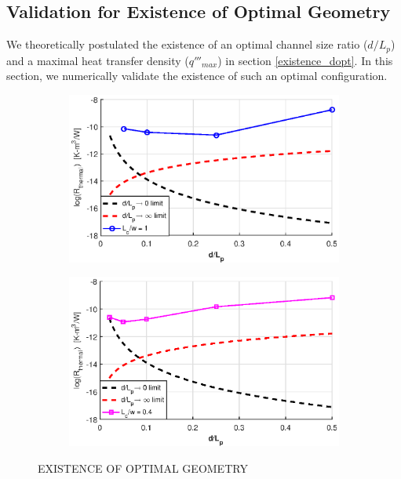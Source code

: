 \documentclass[twocolumn,10pt,cleanfoot]{ihmtc}
\begin{document}
\subsection{Validation for Existence of Optimal Geometry}\label{optgeo}
We theoretically postulated the existence of an optimal channel size ratio ($d/L_p$) and a maximal heat transfer density ($q'''_{max}$) in section \ref{existence_dopt}. In this section, we numerically validate the existence of such an optimal configuration. 
%
\begin{figure}
\centering
   \begin{subfigure}[b]{0.55\textwidth}
   \includegraphics[width=0.85\linewidth]{Rmin_a.eps}
   \caption{}
   \label{Rmin_a} 
\end{subfigure}
%
   \begin{subfigure}[b]{0.55\textwidth}
   \includegraphics[width=0.85\linewidth]{Rmin_b.eps}
   \caption{}
   \label{Rmin_b} 
\end{subfigure}
%
%
%
\caption{EXISTENCE OF OPTIMAL GEOMETRY}
\vspace{-3em}
\end{figure}
\end{document}
